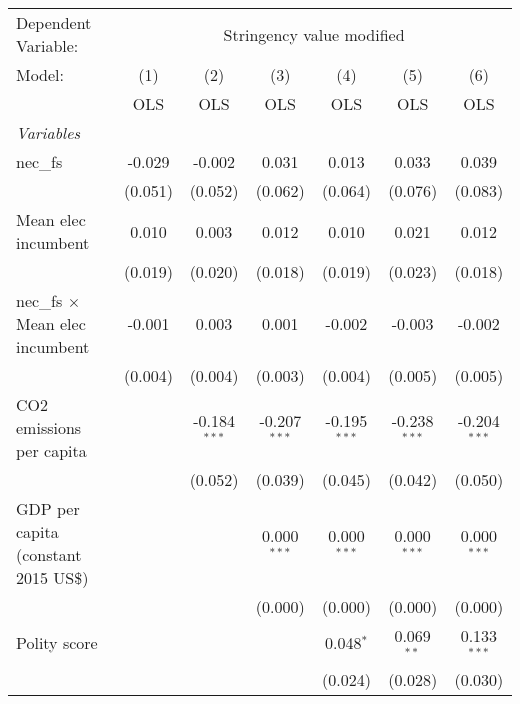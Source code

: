 
\begingroup
\centering
\begin{tabular}{lcccccc}
   \toprule
   Dependent Variable: & \multicolumn{6}{c}{Stringency value modified}\\
   Model:                                 & (1)     & (2)            & (3)            & (4)            & (5)            & (6)\\  
                                          &  OLS    & OLS            & OLS            & OLS            & OLS            & OLS\\  
   \midrule
   \emph{Variables}\\
   nec\_fs                                & -0.029  & -0.002         & 0.031          & 0.013          & 0.033          & 0.039\\   
                                          & (0.051) & (0.052)        & (0.062)        & (0.064)        & (0.076)        & (0.083)\\   
   Mean elec incumbent                    & 0.010   & 0.003          & 0.012          & 0.010          & 0.021          & 0.012\\   
                                          & (0.019) & (0.020)        & (0.018)        & (0.019)        & (0.023)        & (0.018)\\   
   nec\_fs $\times$ Mean elec incumbent   & -0.001  & 0.003          & 0.001          & -0.002         & -0.003         & -0.002\\   
                                          & (0.004) & (0.004)        & (0.003)        & (0.004)        & (0.005)        & (0.005)\\   
   CO2 emissions per capita               &         & -0.184$^{***}$ & -0.207$^{***}$ & -0.195$^{***}$ & -0.238$^{***}$ & -0.204$^{***}$\\   
                                          &         & (0.052)        & (0.039)        & (0.045)        & (0.042)        & (0.050)\\   
   GDP per capita (constant 2015 US\$)    &         &                & 0.000$^{***}$  & 0.000$^{***}$  & 0.000$^{***}$  & 0.000$^{***}$\\   
                                          &         &                & (0.000)        & (0.000)        & (0.000)        & (0.000)\\   
   Polity score                           &         &                &                & 0.048$^{*}$    & 0.069$^{**}$   & 0.133$^{***}$\\   
                                          &         &                &                & (0.024)        & (0.028)        & (0.030)\\   

\end{tabular}
